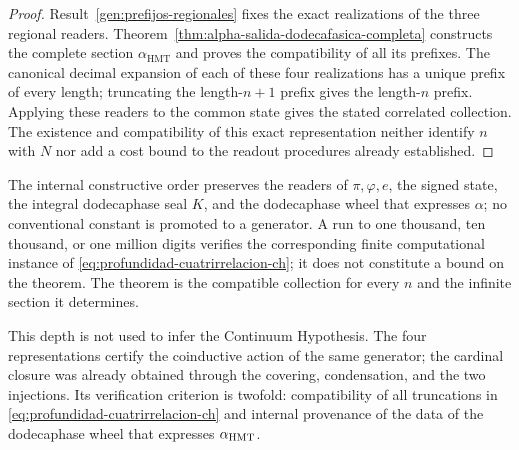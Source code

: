 \begin{proof}
Result~\ref{gen:prefijos-regionales} fixes the exact realizations of the three
regional readers. Theorem~\ref{thm:alpha-salida-dodecafasica-completa}
constructs the complete section \(\alpha_{\mathrm{HMT}}\) and proves the
compatibility of all its prefixes. The canonical decimal expansion of each of
these four realizations has a unique prefix of every length; truncating the
length-\(n+1\) prefix gives the length-\(n\) prefix. Applying these readers to
the common state gives the stated correlated collection. The existence and
compatibility of this exact representation neither identify \(n\) with \(N\) nor
add a cost bound to the readout procedures already established.
\end{proof}

The internal constructive order preserves the readers of
\(\pi,\varphi,e\), the signed state, the integral dodecaphase seal \(K\), and
the dodecaphase wheel that expresses \(\alpha\); no conventional constant is
promoted to a generator. A run to one thousand, ten thousand, or one million
digits verifies the corresponding finite computational instance of
\eqref{eq:profundidad-cuatrirrelacion-ch}; it does not constitute a bound on
the theorem. The theorem is the compatible collection for every \(n\) and the
infinite section it determines.

This depth is not used to infer the Continuum Hypothesis. The four representations
certify the coinductive action of the same generator; the cardinal closure was
already obtained through the covering, condensation, and the two injections.
Its verification criterion is twofold: compatibility of all truncations in
\eqref{eq:profundidad-cuatrirrelacion-ch} and internal provenance of the data
of the dodecaphase wheel that expresses \(\alpha_{\rm HMT}\).
